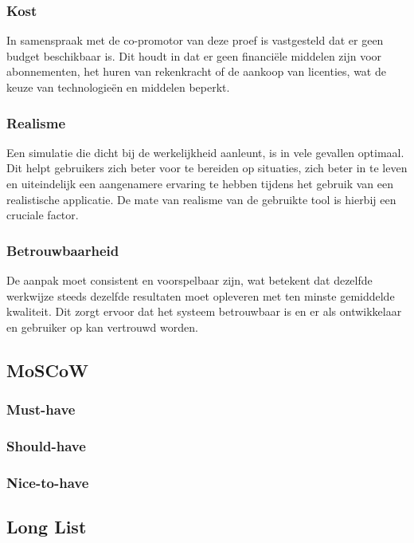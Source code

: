 \subsubsection{Kost}

In samenspraak met de co-promotor van deze proef is vastgesteld dat er geen budget beschikbaar is. Dit houdt in dat er geen financiële middelen zijn voor abonnementen, het huren van rekenkracht of de aankoop van licenties, wat de keuze van technologieën en middelen beperkt.

\subsubsection{Realisme}

Een simulatie die dicht bij de werkelijkheid aanleunt, is in vele gevallen optimaal. Dit helpt gebruikers zich beter voor te bereiden op situaties, zich beter in te leven en uiteindelijk een aangenamere ervaring te hebben tijdens het gebruik van een realistische applicatie. De mate van realisme van de gebruikte tool is hierbij een cruciale factor.

\subsubsection{Betrouwbaarheid}

De aanpak moet consistent en voorspelbaar zijn, wat betekent dat dezelfde werkwijze steeds dezelfde resultaten moet opleveren met ten minste gemiddelde kwaliteit. Dit zorgt ervoor dat het systeem betrouwbaar is en er als ontwikkelaar en gebruiker op kan vertrouwd worden. 

\subsection{MoSCoW}



\subsubsection{Must-have}
\subsubsection{Should-have}
\subsubsection{Nice-to-have}

\subsection{Long List}

